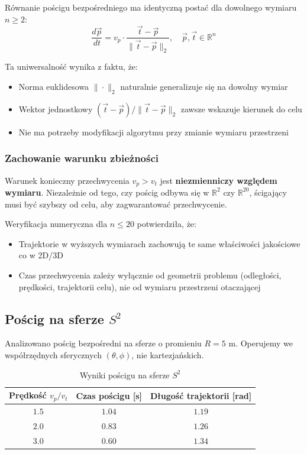 \documentclass[12pt,a4paper]{article}
\begin{document}
Równanie pościgu bezpośredniego ma identyczną postać dla dowolnego wymiaru $n \geq 2$:
\begin{equation}
\frac{d\vec{p}}{dt} = v_p \cdot \frac{\vec{t} - \vec{p}}{\|\vec{t} - \vec{p}\|_2}, \quad \vec{p}, \vec{t} \in \mathbb{R}^n
\end{equation}

Ta uniwersalność wynika z faktu, że:
\begin{itemize}
    \item Norma euklidesowa $\|\cdot\|_2$ naturalnie generalizuje się na dowolny wymiar
    \item Wektor jednostkowy $(\vec{t} - \vec{p})/\|\vec{t} - \vec{p}\|_2$ zawsze wskazuje kierunek do celu
    \item Nie ma potrzeby modyfikacji algorytmu przy zmianie wymiaru przestrzeni
\end{itemize}

\subsubsection{Zachowanie warunku zbieżności}

Warunek konieczny przechwycenia $v_p > v_t$ jest \textbf{niezmienniczy względem wymiaru}. Niezależnie od tego, czy pościg odbywa się w $\mathbb{R}^2$ czy $\mathbb{R}^{20}$, ścigający musi być szybszy od celu, aby zagwarantować przechwycenie.

Weryfikacja numeryczna dla $n \leq 20$ potwierdziła, że:
\begin{itemize}
    \item Trajektorie w wyższych wymiarach zachowują te same właściwości jakościowe co w 2D/3D
    \item Czas przechwycenia zależy wyłącznie od geometrii problemu (odległości, prędkości, trajektorii celu), nie od wymiaru przestrzeni otaczającej
\end{itemize}

\subsection{Pościg na sferze $S^2$}

Analizowano pościg bezpośredni na sferze o promieniu $R = 5$ m. Operujemy we współrzędnych sferycznych $(\theta, \phi)$, nie kartezjańskich.

\begin{table}[H]
\centering
\caption{Wyniki pościgu na sferze $S^2$}
\label{tab:sphere_pursuit_results}
\begin{tabular}{@{}ccc@{}}
\toprule
\textbf{Prędkość $v_p/v_t$} & \textbf{Czas pościgu [s]} & \textbf{Długość trajektorii [rad]} \\ \midrule
$1.5$ & $1.04$ & $1.19$ \\
$2.0$ & $0.83$ & $1.26$ \\
$3.0$ & $0.60$ & $1.34$ \\ \bottomrule
\end{tabular}
\end{table}
\end{document}
